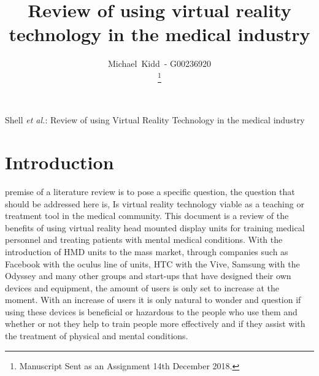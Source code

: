 \documentclass[10pt,journal,compsoc]{IEEEtran}
\begin{document}
	
	\title{Review of using virtual reality technology in the medical industry}
	
	\author{Michael~Kidd~- G00236920%
	
		\thanks{Manuscript Sent as an Assignment 14th December 2018.}}
	
	{Shell \MakeLowercase{\textit{et al.}}: Review of using Virtual Reality Technology in the medical industry}
	
	
	\maketitle
	
	\section{Introduction}
	 premise of a literature review is to pose a specific question, the question that should be addressed here is, Is virtual reality technology viable as a teaching or treatment tool in the medical community. This document is a review of the benefits of using virtual reality head mounted display units for training medical personnel and treating patients with mental medical conditions. With the introduction of HMD units to the mass market, through companies such as Facebook with the oculus line of units, HTC with the Vive, Samsung with the Odyssey and many other groups and start-ups that have designed their own devices and equipment, the amount of users is only set to increase at the moment. With an increase of users it is only natural to wonder and question if using these devices is beneficial or hazardous to the people who use them and whether or not they help to train people more effectively and if they assist with the treatment of physical and mental conditions. \newline
	
\end{document}

